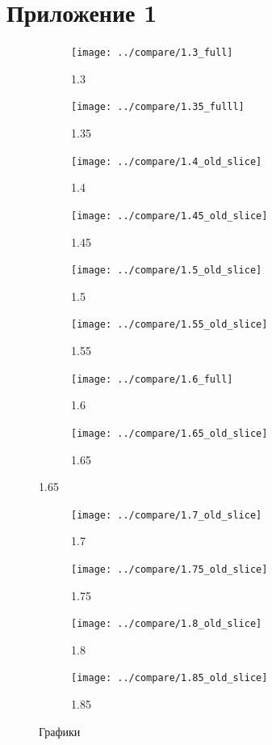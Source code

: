 \documentclass[a4paper]{article}
\begin{document}
	\section{Приложение 1}
	\begin{figure}[H]
		\begin{subfigure}{.5\textwidth}
		\texttt{[image: ../compare/1.3\_full]}
		\caption{1.3}
		\label{fig:21}
		\end{subfigure}
		\begin{subfigure}{.5\textwidth}
		\texttt{[image: ../compare/1.35\_fulll]}
		\caption{1.35}
		\label{fig:22}
		\end{subfigure}%
	
		\begin{subfigure}{.5\textwidth}
		\texttt{[image: ../compare/1.4\_old\_slice]}
		\caption{1.4}
		\label{fig:23}
		\end{subfigure}
		\begin{subfigure}{.5\textwidth}
		\texttt{[image: ../compare/1.45\_old\_slice]}
		\caption{1.45}
		\label{fig:24}
		\end{subfigure}%
	
		\begin{subfigure}{.5\textwidth}
		\texttt{[image: ../compare/1.5\_old\_slice]}
		\caption{1.5}
		\label{fig:25}
		\end{subfigure}
		\begin{subfigure}{.5\textwidth}
		\texttt{[image: ../compare/1.55\_old\_slice]}
		\caption{1.55}
		\label{fig:26}
		\end{subfigure}%
	
		\begin{subfigure}{.5\textwidth}
		\texttt{[image: ../compare/1.6\_full]}
		\caption{1.6}
		\label{fig:27}
		\end{subfigure}
		\begin{subfigure}{.5\textwidth}
		\texttt{[image: ../compare/1.65\_old\_slice]}
		\caption{1.65}
		\label{fig:28}
		\end{subfigure}%
	\end{figure}
	\begin{figure}
		\ContinuedFloat
		\begin{subfigure}{.5\textwidth}
		\texttt{[image: ../compare/1.7\_old\_slice]}
		\caption{1.7}
		\label{fig:29}
		\end{subfigure}
		\begin{subfigure}{.5\textwidth}
		\texttt{[image: ../compare/1.75\_old\_slice]}
		\caption{1.75}
		\label{fig:30}
		\end{subfigure}%
	
	
		\begin{subfigure}{.5\textwidth}
		\texttt{[image: ../compare/1.8\_old\_slice]}
		\caption{1.8}
		\label{fig:31}
		\end{subfigure}
		\begin{subfigure}{.5\textwidth}
		\texttt{[image: ../compare/1.85\_old\_slice]}
		\caption{1.85}
		\label{fig:32}
		\end{subfigure}%
	
	\label{fig:2}
	\caption{Графики}
	\end{figure}	
\end{document}
